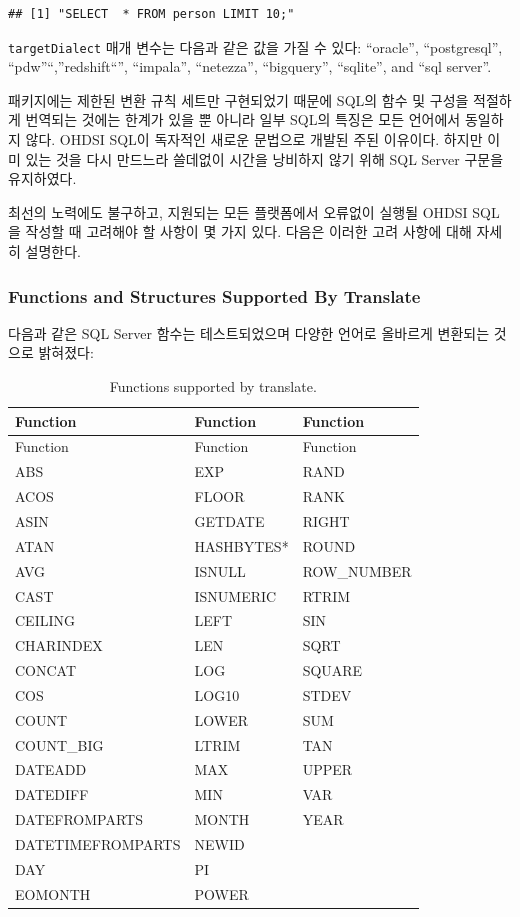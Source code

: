 \documentclass[11pt]{book}
\theoremstyle{definition}
\theoremstyle{definition}
\theoremstyle{definition}
\theoremstyle{remark}
\let\BeginKnitrBlock\begin \let\EndKnitrBlock\end
\begin{document}
\begin{verbatim}
## [1] "SELECT  * FROM person LIMIT 10;"
\end{verbatim}

\texttt{targetDialect} 매개 변수는 다음과 같은 값을 가질 수 있다:
``oracle'', ``postgresql'', ``pdw''``,''redshift``'', ``impala'',
``netezza'', ``bigquery'', ``sqlite'', and ``sql server''.

\BeginKnitrBlock{rmdimportant}
패키지에는 제한된 변환 규칙 세트만 구현되었기 때문에 SQL의 함수 및
구성을 적절하게 번역되는 것에는 한계가 있을 뿐 아니라 일부 SQL의 특징은
모든 언어에서 동일하지 않다. OHDSI SQL이 독자적인 새로운 문법으로 개발된
주된 이유이다. 하지만 이미 있는 것을 다시 만드느라 쓸데없이 시간을
낭비하지 않기 위해 SQL Server 구문을 유지하였다.
\EndKnitrBlock{rmdimportant}

최선의 노력에도 불구하고, 지원되는 모든 플랫폼에서 오류없이 실행될 OHDSI
SQL을 작성할 때 고려해야 할 사항이 몇 가지 있다. 다음은 이러한 고려
사항에 대해 자세히 설명한다.

\subsubsection*{Functions and Structures Supported By
Translate}\label{functions-and-structures-supported-by-translate}

다음과 같은 SQL Server 함수는 테스트되었으며 다양한 언어로 올바르게
변환되는 것으로 밝혀졌다: 

\begin{longtable}[]{@{}lll@{}}
\caption{\label{tab:sqlFunctions} Functions supported by
translate.}\tabularnewline
\toprule
Function & Function & Function\tabularnewline
\midrule
\endfirsthead
\toprule
Function & Function & Function\tabularnewline
\midrule
\endhead
ABS & EXP & RAND\tabularnewline
ACOS & FLOOR & RANK\tabularnewline
ASIN & GETDATE & RIGHT\tabularnewline
ATAN & HASHBYTES* & ROUND\tabularnewline
AVG & ISNULL & ROW\_NUMBER\tabularnewline
CAST & ISNUMERIC & RTRIM\tabularnewline
CEILING & LEFT & SIN\tabularnewline
CHARINDEX & LEN & SQRT\tabularnewline
CONCAT & LOG & SQUARE\tabularnewline
COS & LOG10 & STDEV\tabularnewline
COUNT & LOWER & SUM\tabularnewline
COUNT\_BIG & LTRIM & TAN\tabularnewline
DATEADD & MAX & UPPER\tabularnewline
DATEDIFF & MIN & VAR\tabularnewline
DATEFROMPARTS & MONTH & YEAR\tabularnewline
DATETIMEFROMPARTS & NEWID &\tabularnewline
DAY & PI &\tabularnewline
EOMONTH & POWER &\tabularnewline
\bottomrule
\end{longtable}
\end{document}
